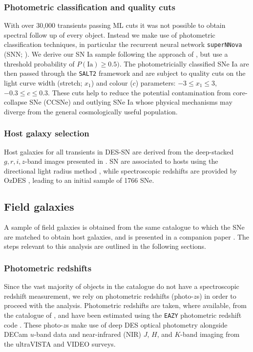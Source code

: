\documentclass[fleqn,usenatbib]{mnras}
\begin{document}
\subsubsection{Photometric classification and quality cuts \label{subsubsec:sn_classify}}
With over 30,000 transients passing ML cuts it was not possible to obtain spectral follow up of every object. Instead we make use of photometric classification techniques, in particular the recurrent neural network \texttt{superNNova} (SNN; \citealt{Moller2019}). We derive our SN Ia sample following the approach of \citet{Scolnic2020}, but use a threshold probability of $P(\mathrm{Ia})\geq0.5)$. The photometricially classified SNe Ia are then passed through the \texttt{SALT2} framework \citep{Betoule2014} and are subject to quality cuts on the light curve width (stretch; $x_1$) and colour ($c$) parameters: $-3 \leq x_1 \leq 3$, $-0.3 \leq c \leq 0.3$. These cuts help to reduce the potential contamination from core-collapse SNe (CCSNe) and outlying SNe Ia whose physical mechanisms may diverge from the general cosmologically useful population.

\subsubsection{Host galaxy selection \label{subsubsec:sn_hosts}}
Host galaxies for all transients in DES-SN are derived from the deep-stacked $g, r, i, z$-band images presented in \citet{Wiseman2020}. SN are associated to hosts using the directional light radius method \citep[e.g.][]{Sullivan2006,Gupta2016}, while spectroscopic redshifts are provided by OzDES \citep{Yuan2015,Childress2017,Lidman2020}, leading to an initial sample of 1766 SNe.

\subsection{Field galaxies\label{subsec:field_sample}}
A sample of field galaxies is obtained from the same catalogue to which the SNe are matched to obtain host galaxies, and is presented in a companion paper \citet{Wiseman2021}. The steps relevant to this analysis are outlined in the following sections.

\subsubsection{Photometric redshifts \label{subsubsec:photozs}}


Since the vast majority of objects in the \citet{Wiseman2021} catalogue do not have a spectroscopic redshift measurement, we rely on photometric redshifts (photo-$z$s) in order to proceed with the analysis. 
Photometric redshifts are taken, where available, from the catalogue of \citet{Hartley2020}, and have been estimated using the \texttt{EAZY} photometric redshift code \citep{Brammer2008}. These photo-$z$s make use of deep DES optical photometry alongside DECam $u$-band data and near-infrared (NIR) $J$, $H$, and $K$-band imaging from the ultraVISTA and VIDEO surveys. 
\end{document}
